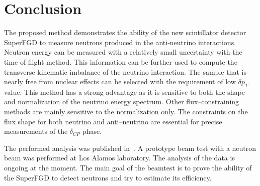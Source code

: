 \documentclass[main.tex]{subfiles}
\begin{document}
\section{Conclusion}
The proposed method demonstrates the ability of the new scintillator detector SuperFGD to measure neutrons produced in the anti-neutrino interactions. Neutron energy can be measured with a relatively small uncertainty with the time of flight method. This information can be further used to compute the transverse kinematic imbalance of the neutrino interaction. The sample that is nearly free from nuclear effects can be selected with the requirement of low $\delta p_T$ value. This method has a strong advantage as it is sensitive to both the shape and normalization of the neutrino energy spectrum. Other flux--constraining methods are mainly sensitive to the normalization only. The constraints on the flux shape for both neutrino and anti--neutrino are essential for precise measurements of the $\delta_{CP}$ phase.

The performed analysis was published in~\cite{Munteanu2019}. A prototype beam test with a neutron beam was performed at Los Alamos laboratory. The analysis of the data is ongoing at the moment. The main goal of the beamtest is to prove the ability of the SuperFGD to detect neutrons and try to estimate its efficiency.
\end{document}
